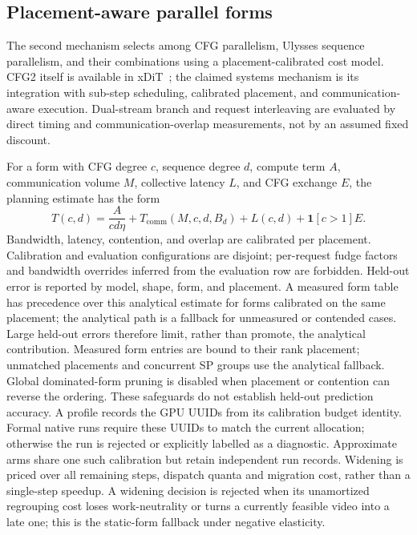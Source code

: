 \documentclass[11pt,a4paper]{article}
\begin{document}
\subsection{Placement-aware parallel forms}
The second mechanism selects among CFG parallelism, Ulysses sequence
parallelism, and their combinations using a placement-calibrated cost model.
CFG2 itself is available in xDiT~\cite{fang2024xdit}; the claimed systems
mechanism is its integration with sub-step scheduling, calibrated placement,
and communication-aware execution. Dual-stream branch and request interleaving
are evaluated by direct timing and communication-overlap measurements, not by
an assumed fixed discount.

For a form with CFG degree $c$, sequence degree $d$, compute term $A$,
communication volume $M$, collective latency $L$, and CFG exchange $E$, the
planning estimate has the form
\begin{equation}
  T(c,d)=\frac{A}{cd\eta}+T_{\mathrm{comm}}(M,c,d,B_d)+L(c,d)+\mathbf{1}[c>1]E.
\end{equation}
Bandwidth, latency, contention, and overlap are calibrated per placement.
Calibration and evaluation configurations are disjoint; per-request fudge
factors and bandwidth overrides inferred from the evaluation row are forbidden.
Held-out error is reported by model, shape, form, and placement. A measured
form table has precedence over this analytical estimate for forms calibrated
on the same placement; the analytical path is a fallback for unmeasured or
contended cases. Large held-out errors therefore limit, rather than promote,
the analytical contribution. Measured form entries are bound to their rank
placement; unmatched placements and concurrent SP groups use the analytical
fallback. Global dominated-form pruning is disabled when placement or contention
can reverse the ordering. These safeguards do not establish held-out prediction
accuracy. A profile records the GPU UUIDs from its calibration
budget identity. Formal native runs require these UUIDs to match the current
allocation; otherwise the run is rejected or explicitly labelled as a diagnostic.
Approximate arms share one such calibration but retain independent run records.
Widening is priced over all remaining steps, dispatch quanta and migration cost,
rather than a single-step speedup. A widening decision is rejected when its
unamortized regrouping cost loses work-neutrality or turns a currently feasible
video into a late one; this is the static-form fallback under negative elasticity.
\end{document}
